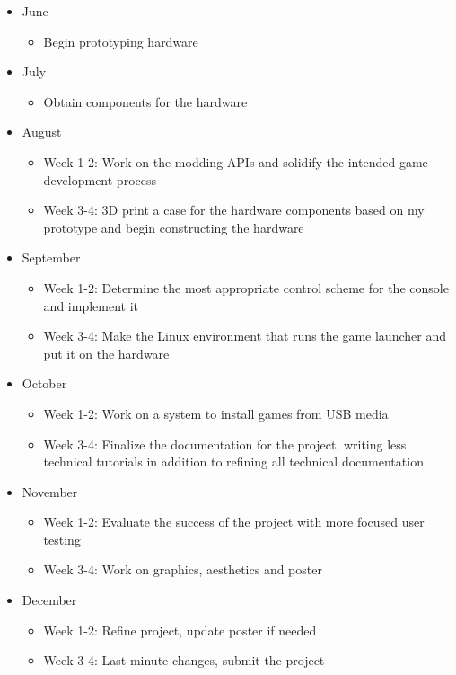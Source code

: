 \documentclass[10pt,twocolumn]{article}
\begin{document}
\begin{itemize}
    \item June
        \begin{itemize}
            \item Begin prototyping hardware
        \end{itemize}
    \item July
        \begin{itemize}
            \item Obtain components for the hardware
        \end{itemize}
    \item August
        \begin{itemize}
            \item Week 1-2: Work on the modding APIs and solidify the intended
                  game development process
            \item Week 3-4: 3D print a case for the hardware components
                  based on my prototype and begin constructing the hardware
        \end{itemize}
    \item September
        \begin{itemize}
            \item Week 1-2: Determine the most appropriate control scheme for
                  the console and implement it
            \item Week 3-4: Make the Linux environment that runs the game
                  launcher and put it on the hardware
        \end{itemize}
    \item October
        \begin{itemize}
            \item Week 1-2: Work on a system to install games from USB media
            \item Week 3-4: Finalize the documentation for the project, writing
                  less technical tutorials in addition to refining all technical
                  documentation
        \end{itemize}
    \item November
        \begin{itemize}
            \item Week 1-2: Evaluate the success of the project with more
                  focused user testing
            \item Week 3-4: Work on graphics, aesthetics and poster
        \end{itemize}
    \item December
        \begin{itemize}
            \item Week 1-2: Refine project, update poster if needed
            \item Week 3-4: Last minute changes, submit the project
        \end{itemize}
\end{itemize}

\printbibliography

\appendix

\clearpage

\onecolumn
\end{document}
